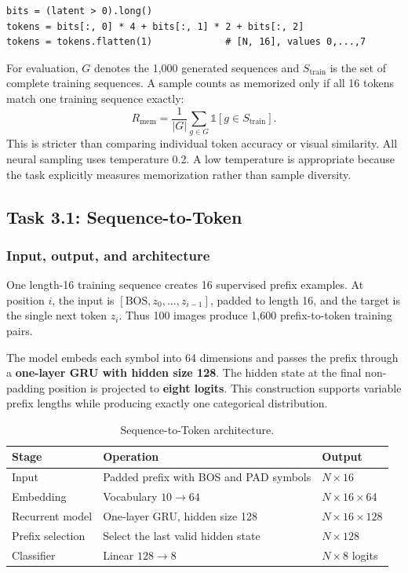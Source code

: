 \documentclass[11pt]{article}
\newcommand{\keyarch}[1]{\textcolor{codeblue}{\textbf{#1}}}
\begin{document}
\begin{lstlisting}
bits = (latent > 0).long()
tokens = bits[:, 0] * 4 + bits[:, 1] * 2 + bits[:, 2]
tokens = tokens.flatten(1)             # [N, 16], values 0,...,7
\end{lstlisting}

For evaluation, $G$ denotes the 1,000 generated sequences and $S_{\mathrm{train}}$ is the set of complete training sequences. A sample counts as memorized only if all 16 tokens match one training sequence exactly:
\begin{equation}
 R_{\mathrm{mem}}=\frac{1}{|G|}\sum_{g\in G}
 \mathbb{1}[g\in S_{\mathrm{train}}].
\end{equation}
This is stricter than comparing individual token accuracy or visual similarity. All neural sampling uses temperature 0.2. A low temperature is appropriate because the task explicitly measures memorization rather than sample diversity.

\subsection{Task 3.1: Sequence-to-Token}

\subsubsection{Input, output, and architecture}

One length-16 training sequence creates 16 supervised prefix examples. At position $i$, the input is $[\mathrm{BOS},z_0,\ldots,z_{i-1}]$, padded to length 16, and the target is the single next token $z_i$. Thus 100 images produce 1,600 prefix-to-token training pairs.

The model embeds each symbol into 64 dimensions and passes the prefix through a \keyarch{one-layer GRU with hidden size 128}. The hidden state at the final non-padding position is projected to \keyarch{eight logits}. This construction supports variable prefix lengths while producing exactly one categorical distribution.

\begin{table}[H]
\centering
\caption{Sequence-to-Token architecture.}
\begin{tabularx}{\textwidth}{lXl}
\toprule
Stage & Operation & Output \\
\midrule
Input & Padded prefix with BOS and PAD symbols & $N\times16$ \\
Embedding & Vocabulary $10\rightarrow64$ & $N\times16\times64$ \\
Recurrent model & One-layer GRU, hidden size 128 & $N\times16\times128$ \\
Prefix selection & Select the last valid hidden state & $N\times128$ \\
Classifier & Linear $128\rightarrow8$ & $N\times8$ logits \\
\bottomrule
\end{tabularx}
\end{table}
\end{document}
